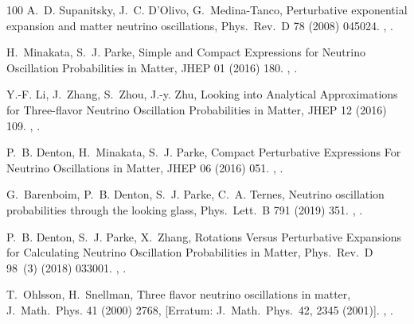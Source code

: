 \documentclass[final,5p,times,twocolumn]{elsarticle}
\begin{document}
\begin{thebibliography}{100}
A.~D. Supanitsky, J.~C. D'Olivo, G.~Medina-Tanco, {Perturbative exponential
  expansion and matter neutrino oscillations}, Phys.\ Rev.\ D 78 (2008) 045024.
\newblock \href {http://arxiv.org/abs/0804.1105} {},
  \href {http://dx.doi.org/10.1103/PhysRevD.78.045024}
  {}.

H.~Minakata, S.~J. Parke, {Simple and Compact Expressions for Neutrino
  Oscillation Probabilities in Matter}, JHEP 01 (2016) 180.
\newblock \href {http://arxiv.org/abs/1505.01826} {},
  \href {http://dx.doi.org/10.1007/JHEP01(2016)180}
  {}.

Y.-F. Li, J.~Zhang, S.~Zhou, J.-y. Zhu, {Looking into Analytical Approximations
  for Three-flavor Neutrino Oscillation Probabilities in Matter}, JHEP 12
  (2016) 109.
\newblock \href {http://arxiv.org/abs/1610.04133} {},
  \href {http://dx.doi.org/10.1007/JHEP12(2016)109}
  {}.

P.~B. Denton, H.~Minakata, S.~J. Parke, {Compact Perturbative Expressions For
  Neutrino Oscillations in Matter}, JHEP 06 (2016) 051.
\newblock \href {http://arxiv.org/abs/1604.08167} {},
  \href {http://dx.doi.org/10.1007/JHEP06(2016)051}
  {}.

G.~Barenboim, P.~B. Denton, S.~J. Parke, C.~A. Ternes, {Neutrino oscillation
  probabilities through the looking glass}, Phys.\ Lett.\ B 791 (2019) 351.
\newblock \href {http://arxiv.org/abs/1902.00517} {},
  \href {http://dx.doi.org/10.1016/j.physletb.2019.03.002}
  {}.

P.~B. Denton, S.~J. Parke, X.~Zhang, {Rotations Versus Perturbative Expansions
  for Calculating Neutrino Oscillation Probabilities in Matter}, Phys.\ Rev.\ D
  98~(3) (2018) 033001.
\newblock \href {http://arxiv.org/abs/1806.01277} {},
  \href {http://dx.doi.org/10.1103/PhysRevD.98.033001}
  {}.

T.~Ohlsson, H.~Snellman, {Three flavor neutrino oscillations in matter}, J.\
  Math.\ Phys. 41 (2000) 2768, [Erratum: J.\ Math.\ Phys.\ 42, 2345 (2001)].
\newblock \href {http://arxiv.org/abs/hep-ph/9910546}
  {}, \href {http://dx.doi.org/10.1063/1.533270}
  {\path{doi:10.1063/1.533270}}.


\end{thebibliography}
\end{document}
